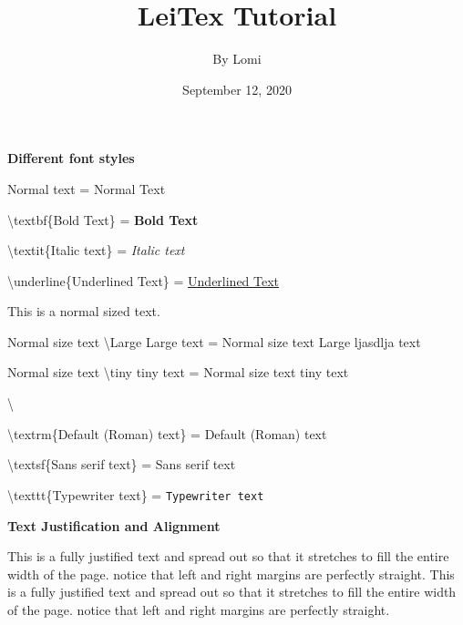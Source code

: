 \documentclass[a4paper, 12pt]{book}
\begin{document}
\title{\LARGE{\textbf{LeiTex Tutorial}}}
\author{By Lomi}
\date{September 12, 2020}


\maketitle


\Large{\textbf{Different font styles}}

\normalsize
Normal text = Normal Text

\textbackslash textbf\{Bold Text\} = \textbf{Bold Text}

\textbackslash textit\{Italic text\} = \textit{Italic text}

\textbackslash underline\{Underlined Text\} = \underline{Underlined Text}




\hfill \break


This is a normal sized text.

Normal size text \textbackslash Large Large text = Normal size text {\LARGE Large ljasdlja} text

Normal size text \textbackslash tiny tiny text = Normal size text {\tiny tiny} text

\textbackslash
\hfill
\break

\textbackslash textrm\{Default (Roman) text\} = \textrm{Default (Roman) text}

\textbackslash textsf\{Sans serif text\} = \textsf{Sans serif text}

\textbackslash texttt\{Typewriter text\} = \texttt{Typewriter text}
\\[\baselineskip]



\begin{center}
  \Large{\textbf{Text Justification and Alignment}}
\end{center}

This is a fully justified text and spread out so that it stretches to fill the entire width of the page. notice that left and right margins are perfectly straight.
This is a fully justified text and spread out so that it stretches to fill the entire width of the page. notice that left and right margins are perfectly straight.
\end{document}
